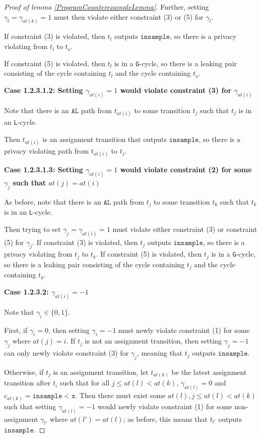 \documentclass[12pt]{article}
\newcommand{\lguard}[1][x]{\texttt{insample} < #1}
\newcommand{\gcycle}{\texttt{G}-cycle}
\newcommand{\lcycle}{\texttt{L}-cycle}
\theoremstyle{definition}
\begin{document}
\begin{proof}[Proof of lemma \ref{ProgramCounterexampleLemma}]
    Further, setting $\gamma_l = \gamma_{at(k)} = 1$ must then violate either constraint (3) or (5) for $\gamma_l$. 

    If constraint (3) is violated, then $t_l$ outputs $\texttt{insample}$, so there is a privacy violating from $t_l$ to $t_o$.

    If constraint (5) is violated, then $t_l$ is in a \gcycle, so there is a leaking pair consisting of the cycle containing $t_l$ and the cycle containing $t_o$. 

    \textbf{Case 1.2.3.1.2: Setting $\gamma_{at(i)}=1$ would violate constraint (3) for $\gamma_{at(i)}$}

    Note that there is an $\texttt{AL}$ path from $t_{at(i)}$ to some transition $t_j$ such that $t_j$ is in an \lcycle.

    Then $t_{at(i)}$ is an assignment transition that outputs $\texttt{insample}$, so there is a privacy violating path from $t_{at(i)}$ to $t_j$. 
    
    \textbf{Case 1.2.3.1.3: Setting $\gamma_{at(i)}=1$ would violate constraint (2) for some $\gamma_j$ such that $at(j) = at(i)$}

    As before, note that there is an $\texttt{AL}$ path from $t_{j}$ to some transition $t_k$ such that $t_k$ is in an \lcycle.

    Then trying to set $\gamma_j = \gamma_{at(i)} = 1$ must violate either constraint (3) or constraint (5) for $\gamma_j$. If constraint (3) is violated, then $t_j$ outputs $\texttt{insample}$, so there is a privacy violating from $t_j$ to $t_k$. If constraint (5) is violated, then $t_j$ is in a \gcycle, so there is a leaking pair consisting of the cycle containing $t_j$ and the cycle containing $t_k$.  

    \textbf{Case 1.2.3.2: $\gamma_{at(i)} = -1$}

    Note that $\gamma_i \in \{0, 1\}$.

    First, if $\gamma_i = 0$, then setting $\gamma_i = -1$ must newly violate constraint (1) for some $\gamma_j$ where $at(j) = i$. If $t_{j}$ is not an assignment transition, then setting $\gamma_{j} = -1$ can only newly violate constraint (3) for $\gamma_{j}$, meaning that $t_j$ outputs $\texttt{insample}$.

    Otherwise, if $t_j$ is an assignment transition, let $t_{at(k)}$ be the latest assignment transition after $t_{i}$ such that for all $j\leq at(l)< at(k)$, $\gamma_{at(l)} =0$ and $c_{at(k)} = \lguard[\texttt{x}]$. Then there must exist some $at(l), j\leq at(l)< at(k)$ such that setting $\gamma_{at(l)}=-1$ would newly violate constraint (1) for some non-assignment $\gamma_{l'}$ where $at(l') = at(l)$; as before, this means that $t_{l'}$ outputs $\texttt{insample}$.  


\end{proof}
\end{document}
